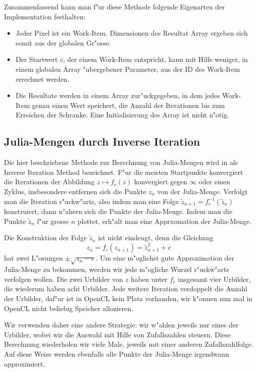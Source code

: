 \begin{refsection}
Zusammenfassend kann man f"ur diese Methode folgende Eigenarten der
Implementation festhalten:
\begin{itemize}
\item Jeder Pixel ist ein Work-Item. Dimensionen des Resultat Array
ergeben sich somit aus der globalen Gr"osse.
\item Der Startwert $c$, der einem Work-Item entspricht, kann mit Hilfe
weniger, in einem globalen Array "ubergebener Parameter, aus der
ID des Work-Item errechnet werden.
\item Die Resultate werden in einem Array zur"uckgegeben, in dem jedes
Work-Item genau einen Wert speichert, die Anzahl der Iterationen bis
zum Erreichen der Schranke.
Eine Initialisierung des Array ist nicht n"otig.
\end{itemize}

\subsection{Julia-Mengen durch Inverse Iteration}
Die hier beschriebene Methode zur Berechnung von Julia-Mengen wird in
\cite{julia:peitgenrichter} als Inverse Iteration Method bezeichnet.
F"ur die meisten Startpunkte konvergiert die Iterationen der Abbildung
$z\mapsto f_c(z)$ konvergiert gegen $\infty$
oder einen Zyklus, insbesondere entfernen sich die Punkte $z_n$ von der
Julia-Menge.
Verfolgt man die Iteration r"uckw"arts, also indem man eine Folge
$\tilde z_{n+1}=f_c^{-1}(\tilde z_n)$ konstruiert, dann n"ahern sich die
Punkte der Julia-Menge. Indem man die Punkte $\tilde z_n$ f"ur grosse $n$
plottet, erh"alt man eine Apprxomation der Julia-Menge.

Die Konstruktion der Folge $\tilde z_n$ ist nicht eindeugt, denn die
Gleichung
\[
z_n= f_c(z_{n+1})=\tilde z_{n+1}^2+c
\]
hat zwei L"osungen $\pm\sqrt{z_n-c}$. 
Um eine m"oglichst gute Approximation der Julia-Menge zu bekommen, 
werden wir jede m"ogliche Wurzel r"uckw"arts verfolgen wollen.
Die zwei Urbilder von $z$ haben unter $f_c$ insgesamt vier Urbilder, 
die wiederum haben acht Urbilder.
Jede weitere Iteration verdoppelt die Anzahl der Urbilder, daf"ur ist
in OpenCL kein Platz vorhanden, wir k"onnen nun mal in OpenCL nicht beliebig
Speicher allozieren.

Wir verwenden daher eine andere Strategie: wir w"ahlen jeweils nur eines
der Urbilder, wobei wir die Auswahl mit Hilfe von Zufallszahlen steuern.
Diese Berechnung wiederholen wir viele Male, jeweils mit einer anderen
Zufallszahlfolge.
Auf diese Weise werden ebenfalls alle Punkte der Julia-Menge irgendwann
approximiert.


\end{refsection}
